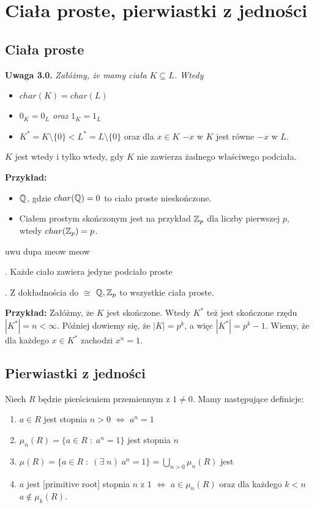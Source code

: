 
\section{Ciała proste, pierwiastki z jedności}

\subsection{Ciała proste}

\textbf{\large\color{blue}Uwaga 3.0.}
    \emph{Załóżmy, że mamy ciała $K\subseteq L$. Wtedy}

\begin{itemize}
\item $char(K)=char(L)$
\item \emph{$0_K=0_L$ oraz $1_K=1_L$}
\item  $K^*=K\setminus\{0\}<L^*=L\setminus\{0\}$ oraz dla $x\in K$ $-x$ w $K$ jest równe $-x$ w $L$.
\end{itemize}

$K$ jest  wtedy i tylko wtedy, gdy $K$ nie zawierza żadnego właściwego podciała. 

\textbf{Przykład:}
\begin{itemize}
\item $\mathbb{Q}$, gdzie $char(\mathbb{Q})=0$ to ciało proste nieskończone.
\item Ciałem prostym skończonym jest na przykład $\mathbb{Z}_p$ dla liczby pierwszej $p$, wtedy $char(\mathbb{Z}_p)=p$.
\end{itemize}

\begin{remark}{\color{pagColor}uwu dupa meow meow}

. Każde ciało zawiera jedyne podciało proste

. Z dokładnościa do $\cong$ $\mathbb{Q},\mathbb{Z}_p$ to wszystkie ciała proste.
\end{remark}

\textbf{Przykład:} Załóżmy, że $K$ jest skończone. Wtedy $K^*$ też jest skończone rzędu $|K^*|=n<\infty$. Później dowiemy się, że $|K|=p^k$, a więc $|K^*|=p^k-1$. Wiemy, że dla każdego $x\in K^*$ zachodzi $x^n=1$.

\subsection{Pierwiastki z jedności}

Niech $R$ będzie pierścieniem przemiennym z $1\neq0$. Mamy następujące definicje:
\begin{enumerate}
\item $a\in R$ jest stopnia $n>0$ $\iff$ $a^n=1$
\item $\mu_n(R)=\{a\in R\;:\;a^n=1\}$ jest  stopnia $n$
\item $\mu(R)=\{a\in R\;:\;(\exists\;n)\;a^n=1\}=\bigcup\limits_{n>0}\mu_n(R)$ jest 
\item $a$ jest  [primitive root] stopnia $n$ z $1$ $\iff$ $a\in\mu_n(R)$ oraz dla każdego $k<n$ $a\notin\mu_k(R)$.
\end{enumerate}

